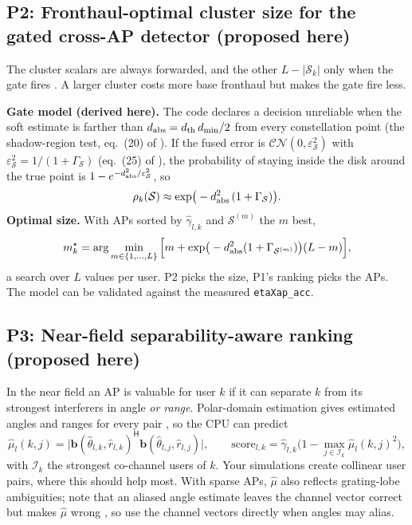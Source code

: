 \documentclass[11pt]{article}
\begin{document}
\subsection{P2: Fronthaul-optimal cluster size for the gated cross-AP detector (proposed here)}
The cluster scalars are always forwarded, and the other $L-|\mathcal S_k|$ only when the gate fires \cite[Sec.~III-B]{haider2026vtc}. A larger cluster costs more base fronthaul but makes the gate fire less.

\textbf{Gate model (derived here).} The code declares a decision unreliable when the soft estimate is farther than $d_{\rm abs}=d_{\rm th}\,d_{\min}/2$ from every constellation point (the shadow-region test, eq.~(20) of \cite{haider2026vtc}). If the fused error is $\mathcal{CN}(0,\varepsilon^2_{\mathcal S})$ with $\varepsilon^2_{\mathcal S}=1/(1+\Gamma_{\mathcal S})$ (eq.~(25) of \cite{haider2026vtc}), the probability of staying inside the disk around the true point is $1-e^{-d_{\rm abs}^2/\varepsilon_{\mathcal S}^2}$, so
\begin{equation}
  \rho_k(\mathcal S)\approx\exp\!\big(-d_{\rm abs}^2\,(1+\Gamma_{\mathcal S})\big).
\end{equation}
\textbf{Optimal size.} With APs sorted by $\hat\gamma_{l,k}$ and $\mathcal S^{(m)}$ the $m$ best,
\begin{equation}
  m_k^\star=\arg\min_{m\in\{1,\dots,L\}}\Big[m+\exp\!\big(-d_{\rm abs}^2(1+\Gamma_{\mathcal S^{(m)}})\big)(L-m)\Big],
  \label{eq:p2}
\end{equation}
a search over $L$ values per user. P2 picks the size, P1's ranking picks the APs. The model can be validated against the measured \texttt{etaXap\_acc}.

\subsection{P3: Near-field separability-aware ranking (proposed here)}
In the near field an AP is valuable for user $k$ if it can separate $k$ from its strongest interferers in angle \emph{or range}. Polar-domain estimation gives estimated angles and ranges for every pair \cite{cui2022channel}, so the CPU can predict
\begin{equation}
  \hat\mu_l(k,j)=\big|\mathbf b(\hat\theta_{l,k},\hat r_{l,k})^{\mathsf H}\mathbf b(\hat\theta_{l,j},\hat r_{l,j})\big|,
  \qquad
  \mathrm{score}_{l,k}=\hat\gamma_{l,k}\Big(1-\max_{j\in\mathcal I_k}\hat\mu_l(k,j)^2\Big),
\end{equation}
with $\mathcal I_k$ the strongest co-channel users of $k$. Your simulations create collinear user pairs, where this should help most. With sparse APs, $\hat\mu$ also reflects grating-lobe ambiguities; note that an aliased angle estimate leaves the channel vector correct but makes $\hat\mu$ wrong \cite{chen2024nearfield}, so use the channel vectors directly when angles may alias.
\end{document}
